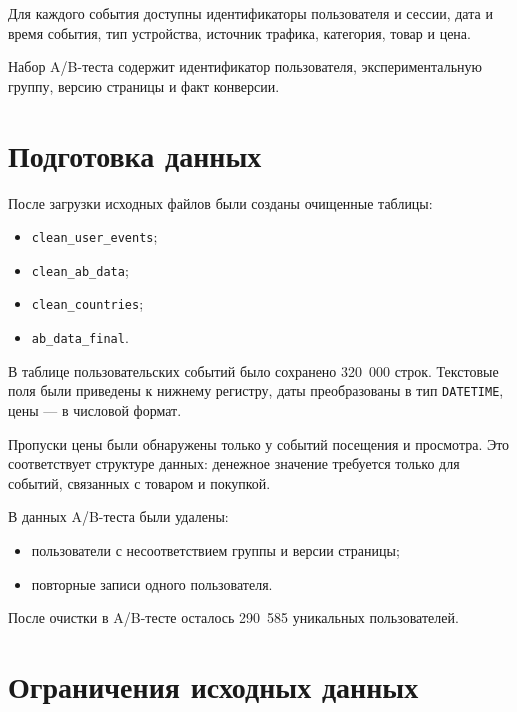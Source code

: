 \documentclass[12pt,a4paper]{extarticle}
\begin{document}
Для каждого события доступны идентификаторы пользователя и сессии,
дата и время события, тип устройства, источник трафика, категория,
товар и цена.

Набор A/B-теста содержит идентификатор пользователя, экспериментальную
группу, версию страницы и факт конверсии.

\section{Подготовка данных}

После загрузки исходных файлов были созданы очищенные таблицы:

\begin{itemize}
    \item \texttt{clean\_user\_events};
    \item \texttt{clean\_ab\_data};
    \item \texttt{clean\_countries};
    \item \texttt{ab\_data\_final}.
\end{itemize}

В таблице пользовательских событий было сохранено 320~000 строк.
Текстовые поля были приведены к нижнему регистру, даты преобразованы
в тип \texttt{DATETIME}, цены --- в числовой формат.

Пропуски цены были обнаружены только у событий посещения и просмотра.
Это соответствует структуре данных: денежное значение требуется
только для событий, связанных с товаром и покупкой.

В данных A/B-теста были удалены:

\begin{itemize}
    \item пользователи с несоответствием группы и версии страницы;
    \item повторные записи одного пользователя.
\end{itemize}

После очистки в A/B-тесте осталось 290~585 уникальных пользователей.

\section{Ограничения исходных данных}
\end{document}
